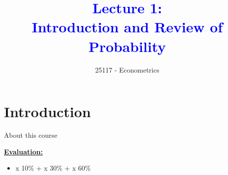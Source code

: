 \documentclass[notes,10pt, aspectratio=169]{beamer}
\title[]{\textcolor{blue}{Lecture 1:\\Introduction and Review of Probability}}
\author{25117 - Econometrics}
\institute[shortinst]{Universitat Pompeu Fabra}
\begin{document}

\begin{frame}[plain]
\maketitle
\end{frame}

\section{Introduction}

\begin{frame}[label=intro_0]{About this course}

\vspace{.3cm}
\underline{\textbf{\large Evaluation:}}\\
\begin{itemize}
    \item[--] \textit{\color{teal}{Problem Sets (Seminars)}} x 10\% +  \textit{\color{orange}{Mid-term Exam:}} x 30\% + \textit{\color{purple}{Final Exam:}} x 60\% 
\end{itemize}

\end{frame}
\end{document}
